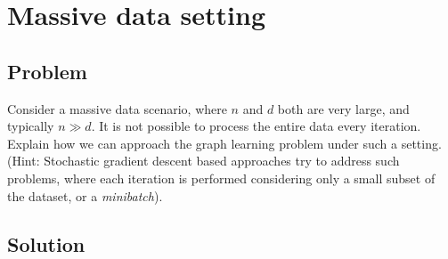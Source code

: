 \documentclass[a4paper]{article}
\begin{document}
\newpage

\section{Massive data setting}

\subsection{Problem}

Consider a massive data scenario, where $n$ and $d$ both are very large, and typically $n \gg d$. It is not possible to process the entire data every iteration. Explain how we can approach
the graph learning problem under such a setting. (Hint: Stochastic gradient descent based approaches try to address such problems, where each iteration is performed considering only a small
subset of the dataset, or a \emph{minibatch}).

\subsection{Solution}
\end{document}
